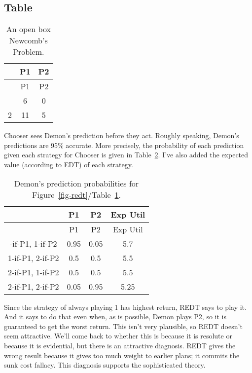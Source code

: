 \documentclass[
  10pt,
  letterpaper,
  DIV=11,
  numbers=noendperiod,
  twoside]{scrartcl}
\begin{document}
\subsection{Table}

\begin{longtable}[]{@{}ccc@{}}
\caption{An open box Newcomb's Problem.}\label{tbl-redt}\tabularnewline
\toprule\noalign{}
& P1 & P2 \\
\midrule\noalign{}
\endfirsthead
\toprule\noalign{}
& P1 & P2 \\
\midrule\noalign{}
\endhead
\bottomrule\noalign{}
\endlastfoot
1 & 6 & 0 \\
2 & 11 & 5 \\
\end{longtable}

Chooser sees Demon's prediction before they act. Roughly speaking,
Demon's predictions are 95\% accurate. More precisely, the probability
of each prediction given each strategy for Chooser is given in
Table~\ref{tbl-redt-strategy}. I've also added the expected value
(according to EDT) of each strategy.

\begin{longtable}[]{@{}cccc@{}}
\caption{Demon's prediction probabilities for
Figure~\ref{fig-redt}/Table~\ref{tbl-redt}.}\label{tbl-redt-strategy}\tabularnewline
\toprule\noalign{}
& P1 & P2 & Exp Util \\
\midrule\noalign{}
\endfirsthead
\toprule\noalign{}
& P1 & P2 & Exp Util \\
\midrule\noalign{}
\endhead
\bottomrule\noalign{}
\endlastfoot
1-if-P1, 1-if-P2 & 0.95 & 0.05 & 5.7 \\
1-if-P1, 2-if-P2 & 0.5 & 0.5 & 5.5 \\
2-if-P1, 1-if-P2 & 0.5 & 0.5 & 5.5 \\
2-if-P1, 2-if-P2 & 0.05 & 0.95 & 5.25 \\
\end{longtable}

Since the strategy of always playing 1 has highest return, REDT says to
play it. And it says to do that even when, as is possible, Demon plays
P2, so it is guaranteed to get the worst return. This isn't very
plausible, so REDT doesn't seem attractive. We'll come back to whether
this is because it is resolute or because it is evidential, but there is
an attractive diagnosis. REDT gives the wrong result because it gives
too much weight to earlier plans; it commits the sunk cost fallacy. This
diagnosis supports the sophisticated theory.
\end{document}
